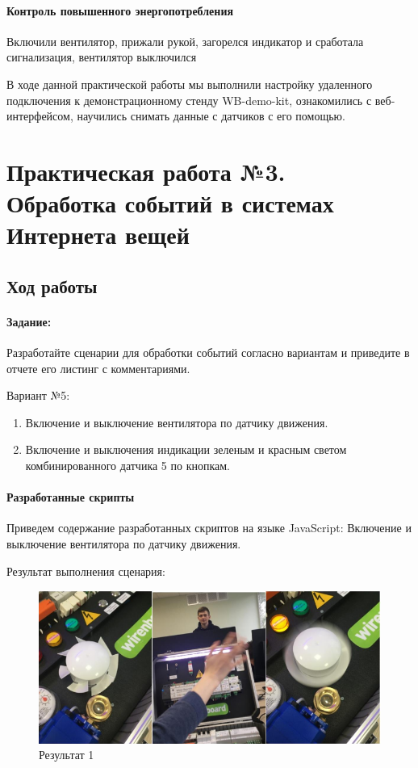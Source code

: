 \documentclass[a4paper,14pt]{extarticle}
\begin{document}
\paragraph{Контроль повышенного энергопотребления}
Включили вентилятор, прижали рукой, загорелся индикатор и сработала сигнализация, вентилятор выключился

В ходе данной практической работы мы выполнили настройку удаленного подключения к демонстрационному стенду  WB-demo-kit, ознакомились с веб-интерфейсом, научились снимать данные с датчиков с его помощью.

\newpage
\section{Практическая работа №3. \\Обработка событий в системах\\Интернета вещей}

\subsection{Ход работы}

\paragraph {Задание:}

Разработайте сценарии для обработки событий согласно вариантам и приведите в отчете его листинг с комментариями.

Вариант №5:
\begin{enumerate}
	\item Включение и выключение вентилятора по датчику движения.
	
	\item Включение и выключения индикации зеленым и красным светом комбинированного датчика 5 по кнопкам.
\end{enumerate}
\paragraph{Разработанные скрипты} Приведем содержание разработанных скриптов на языке JavaScript:
\setcounter{script}{0}
\script Включение и выключение вентилятора по датчику движения.

\newpage
Результат выполнения сценария:
\begin{figure}[htbp]
	\centering
	\includegraphics[width=0.7\linewidth]{images/script1-result}
	\caption{Результат 1}
	\label{fig:script1-result}
\end{figure}
\end{document}
